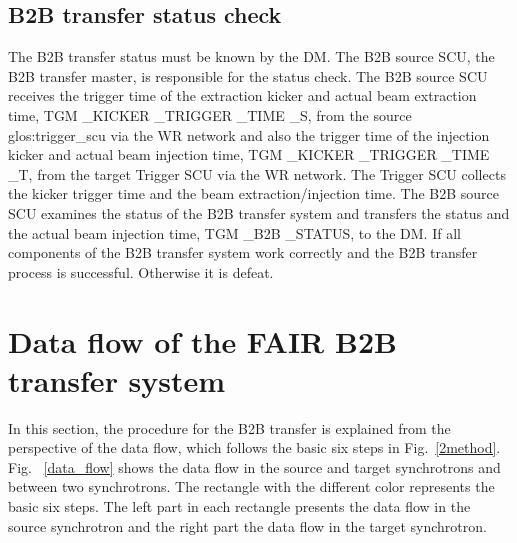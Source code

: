 %

\subsection{B2B transfer status check}
The B2B transfer status must be known by the DM. The B2B source SCU, the B2B transfer master, is responsible for the status check. The B2B source SCU receives the trigger time of the extraction kicker and actual beam extraction time, TGM \_KICKER \_TRIGGER \_TIME \_S, from the source \gls{glos:trigger_scu} via the WR network and also the trigger time of the injection kicker and actual beam injection time, TGM \_KICKER \_TRIGGER \_TIME \_T, from the target Trigger SCU via the WR network. The Trigger SCU collects the kicker trigger time and the beam extraction/injection time. The B2B source SCU examines the status of the B2B transfer system and transfers the status and the actual beam injection time, TGM \_B2B \_STATUS, to the DM. If all components of the B2B transfer system work correctly and the B2B transfer process is successful. Otherwise it is defeat. 
\section{Data flow of the FAIR B2B transfer system}
In this section, the procedure for the B2B transfer is explained from the perspective of the data flow, which follows the basic six steps in Fig.~\ref{2method}. Fig. ~\ref{data_flow} shows the data flow in the source and target synchrotrons and between two synchrotrons. The rectangle with the different color represents the basic six steps. The left part in each rectangle presents the data flow in the source synchrotron and the right part the data flow in the target synchrotron.



